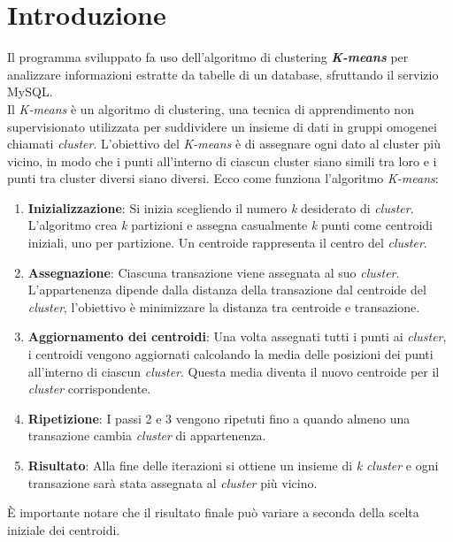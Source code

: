 \section{Introduzione}

Il programma sviluppato fa uso dell'algoritmo di clustering \textbf{\textit{K-means}} per analizzare informazioni estratte da tabelle di un database, sfruttando il servizio MySQL.
\\ Il \textit{K-means} è un algoritmo di clustering, una tecnica di apprendimento non supervisionato utilizzata per suddividere un insieme di dati in gruppi omogenei chiamati \textit{cluster}. 
L'obiettivo del \textit{K-means} è di assegnare ogni dato al cluster più vicino, in modo che i punti all'interno di ciascun cluster siano simili tra loro e i punti tra cluster diversi siano diversi. 
Ecco come funziona l'algoritmo \textit{K-means}: 
\begin{enumerate}
  \item \textbf{Inizializzazione}: Si inizia scegliendo il numero \textit{k} desiderato di \textit{cluster}. L'algoritmo crea \textit{k} partizioni e assegna casualmente \textit{k} punti come centroidi iniziali, uno per partizione. Un centroide rappresenta il centro del \textit{cluster}.
  \item \textbf{Assegnazione}: Ciascuna transazione viene assegnata al suo \textit{cluster}. L'appartenenza  dipende dalla distanza della transazione dal centroide del \textit{cluster}, l'obiettivo è minimizzare la distanza tra centroide e transazione.
  \item \textbf{Aggiornamento dei centroidi}: Una volta assegnati tutti i punti ai \textit{cluster}, i centroidi vengono aggiornati calcolando la media delle posizioni dei punti all'interno di ciascun \textit{cluster}. Questa media diventa il nuovo centroide per il \textit{cluster} corrispondente.
  \item \textbf{Ripetizione}: I passi 2 e 3 vengono ripetuti fino a quando almeno una transazione cambia \textit{cluster} di appartenenza.
  \item \textbf{Risultato}: Alla fine delle iterazioni si ottiene un insieme di \textit{k} \textit{cluster} e ogni transazione sarà stata assegnata al \textit{cluster} più vicino.
\end{enumerate}

\noindent È importante notare che il risultato finale può variare a seconda della scelta iniziale dei centroidi. 
